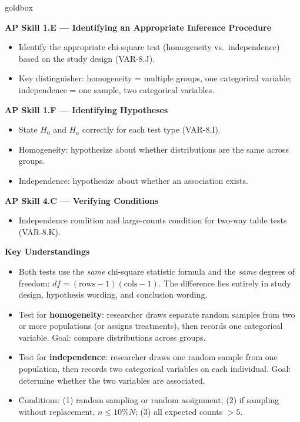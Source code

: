 \documentclass[10pt]{article}
\begin{document}
\begin{skillbox}{goldbox}
\begin{minipage}[t]{0.48\linewidth}
    \textbf{AP Skill 1.E --- Identifying an Appropriate Inference Procedure}
    \begin{itemize}
        \item Identify the appropriate chi-square test (homogeneity vs.\ independence)
              based on the study design (VAR-8.J).
        \item Key distinguisher: homogeneity = multiple groups, one categorical variable;
              independence = one sample, two categorical variables.
    \end{itemize}
    \textbf{AP Skill 1.F --- Identifying Hypotheses}
    \begin{itemize}
        \item State $H_0$ and $H_a$ correctly for each test type (VAR-8.I).
        \item Homogeneity: hypothesize about whether distributions are the same across groups.
        \item Independence: hypothesize about whether an association exists.
    \end{itemize}
    \textbf{AP Skill 4.C --- Verifying Conditions}
    \begin{itemize}
        \item Independence condition and large-counts condition for two-way table tests (VAR-8.K).
    \end{itemize}
\end{minipage}
\hfill
\begin{minipage}[t]{0.48\linewidth}
    \textbf{Key Understandings}
    \begin{itemize}
        \item Both tests use the \emph{same} chi-square statistic formula and the
              \emph{same} degrees of freedom: $df = (\text{rows}-1)(\text{cols}-1)$.
              The difference lies entirely in study design, hypothesis wording, and
              conclusion wording.
        \item Test for \textbf{homogeneity}: researcher draws separate random samples from
              two or more populations (or assigns treatments), then records one categorical
              variable. Goal: compare distributions across groups.
        \item Test for \textbf{independence}: researcher draws one random sample from one
              population, then records two categorical variables on each individual.
              Goal: determine whether the two variables are associated.
        \item Conditions: (1) random sampling or random assignment; (2) if sampling without
              replacement, $n \le 10\%N$; (3) all expected counts $> 5$.
    \end{itemize}
\end{minipage}
\end{skillbox}
\end{document}
